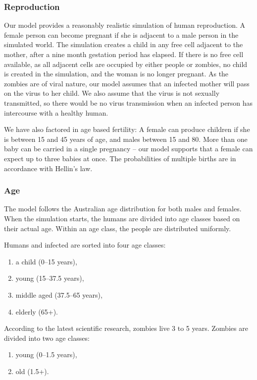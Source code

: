 \documentclass[a4paper]{article}
\begin{document}
\subsubsection{Reproduction}

Our model provides a reasonably realistic simulation of human reproduction.
A female person can become pregnant if she is adjacent to a male person in the simulated world.
The simulation creates a child in any free cell adjacent to the mother, after a nine month gestation period has elapsed\cite{pregnancy}.
If there is no free cell available, as all adjacent cells are occupied by either people or zombies, no child is created in the simulation, and the woman is no longer pregnant.
As the zombies are of viral nature, our model assumes that an infected mother will pass on the virus to her child.
We also assume that the virus is not sexually transmitted, so there would be no virus transmission when an infected person has intercourse with a healthy human.

We have also factored in age based fertility: A female can produce children if she is between 15 and 45 years of age, and males between 15 and 80.
More than one baby can be carried in a single pregnancy -- our model supports that a female can expect up to three babies at once.
The probabilities of multiple births are in accordance with Hellin's law. \cite{hellinslaw}

\subsubsection{Age}

The model follows the Australian age distribution for both males and females.
When the simulation starts, the humans are divided into age classes based on their actual age.
Within an age class, the people are distributed uniformly.

Humans and infected are sorted into four age classes:
\begin{enumerate}
\item a child (0--15 years),
\item young (15--37.5 years),
\item middle aged (37.5--65 years),
\item elderly (65+).
\end{enumerate}

According to the latest scientific research, zombies live 3 to 5 years. \cite{zombiepedia}
Zombies are divided into two age classes:
\begin{enumerate}
\item young (0--1.5 years),
\item old (1.5+).
\end{enumerate}
\end{document}
